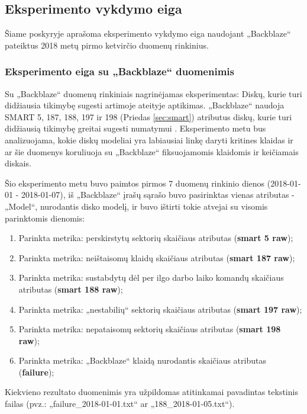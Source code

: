 \documentclass{VUMIFPSkursinis}
\begin{document}
\subsection{Eksperimento vykdymo eiga} \label{subsec:exp}
Šiame poskyryje aprašoma eksperimento vykdymo eiga naudojant „Backblaze“ pateiktus 2018 metų pirmo ketvirčio duomenų rinkinius. 

\subsubsection{Eksperimento eiga su „Backblaze“ duomenimis}
Su „Backblaze“ duomenų rinkiniais nagrinėjamas eksperimentas: Diskų, kurie turi didžiausia tikimybę sugesti artimoje ateityje aptikimas. „Backblaze“ naudoja SMART 5, 187, 188, 197 ir 198 (Priedas \ref{sec:smart}) atributus diskų, kurie turi didžiausią tikimybę greitai sugesti numatymui \cite{backblaze_failure}. Eksperimento metu bus analizuojama, kokie diskų modeliai yra labiausiai linkę daryti kritines klaidas ir ar šie duomenys koruliuoja su „Backblaze“ fiksuojamomis klaidomis ir keičiamais diskais.\par

Šio eksperimento metu buvo paimtos pirmos 7 duomenų rinkinio dienos (2018-01-01 - 2018-01-07), iš „Backblaze“ įrašų sąrašo buvo pasirinktas vienas atributas - „Model“, nurodantis disko modelį, ir buvo ištirti tokie atvejai su visomis parinktomis dienomis:
\begin{enumerate}
\item Parinkta metrika: perskirstytų sektorių skaičiaus atributas (\textbf{smart 5 raw});
\item Parinkta metrika: neištaisomų klaidų skaičiaus atributas (\textbf{smart 187 raw});
\item Parinkta metrika: sustabdytų dėl per ilgo darbo laiko komandų skaičiaus atributas (\textbf{smart 188 raw});
\item Parinkta metrika: „nestabilių“ sektorių skaičiaus atributas (\textbf{smart 197 raw});
\item Parinkta metrika: nepataisomų sektorių skaičiaus atributas (\textbf{smart 198 raw});
\item Parinkta metrika: „Backblaze“ klaidą nurodantis skaičiaus atributas (\textbf{failure});
\end{enumerate}

Kiekvieno rezultato duomenimis yra užpildomas atitinkamai pavadintas tekstinis failas (pvz.: „failure\_2018-01-01.txt“ ar „188\_2018-01-05.txt“).
\end{document}
